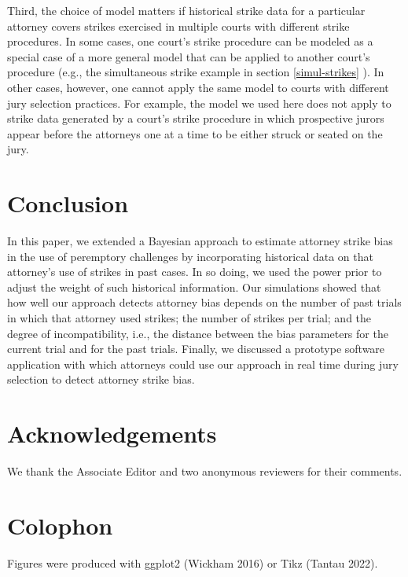 \documentclass[12pt]{article}
\begin{document}
Third, the choice of model matters if historical strike data for a particular attorney covers strikes exercised in multiple courts with different strike procedures. In some cases, one court's strike procedure can be modeled as a special case of a more general model that can be applied to another court's procedure (e.g., the simultaneous strike example in section \ref{simul-strikes} ). In other cases, however, one cannot apply the same model to courts with different jury selection practices. For example, the model we used here does not apply to strike data generated by a court's strike procedure in which prospective jurors appear before the attorneys one at a time to be either struck or seated on the jury.

\hypertarget{conclusion}{%
\section{Conclusion}\label{conclusion}}

In this paper, we extended a Bayesian approach to estimate attorney strike bias in the use of peremptory challenges by incorporating historical data on that attorney's use of strikes in past cases. In so doing, we used the power prior to adjust the weight of such historical information. Our simulations showed that how well our approach detects attorney bias depends on the number of past trials in which that attorney used strikes; the number of strikes per trial; and the degree of incompatibility, i.e., the distance between the bias parameters for the current trial and for the past trials. Finally, we discussed a prototype software application with which attorneys could use our approach in real time during jury selection to detect attorney strike bias.

\hypertarget{acknowledgements}{%
\section{Acknowledgements}\label{acknowledgements}}

We thank the Associate Editor and two anonymous reviewers for their comments.

\hypertarget{colophon}{%
\section{Colophon}\label{colophon}}

Figures were produced with ggplot2 (Wickham 2016) or Tikz (Tantau 2022).
\end{document}
